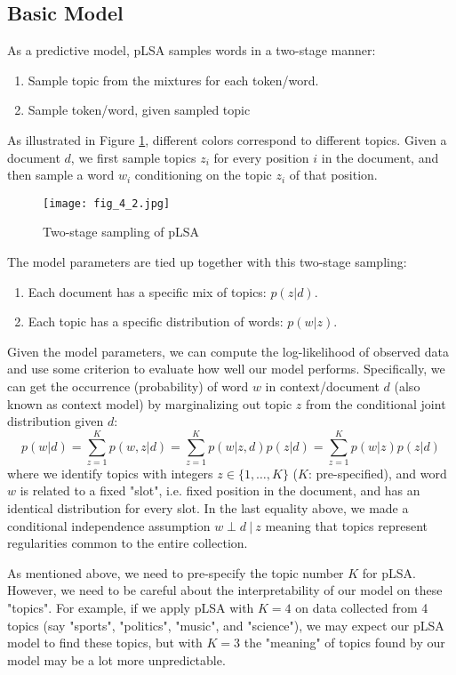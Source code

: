 \documentclass[../main.tex]{subfiles}
\begin{document}
\subsection{Basic Model}
As a predictive model, pLSA samples words in a two-stage manner:
\begin{enumerate}
	\item Sample topic from the mixtures for each token/word.
	\item Sample token/word, given sampled topic
\end{enumerate}
\par As illustrated in Figure \ref{fig_4_2}, different colors correspond to different topics. Given a document $d$, we first sample topics $z_i$ for every position $i$ in the document, and then sample a word $w_i$ conditioning on the topic $z_i$ of that position.
\begin{figure}[h] 
	\centering 
	\texttt{[image: fig\_4\_2.jpg]} 
	\caption{Two-stage sampling of pLSA}\label{fig_4_2}
\end{figure}
\par The model parameters are tied up together with this two-stage sampling:
\begin{enumerate}
	\item Each document has a specific mix of topics: $p(z|d)$.
	\item Each topic has a specific distribution of words: $p(w|z)$.
\end{enumerate}
\par Given the model parameters, we can compute the log-likelihood of observed data and use some criterion to evaluate how well our model performs. Specifically, we can get the occurrence (probability) of word $w$ in context/document $d$ (also known as context model) by marginalizing out topic $z$ from the conditional joint distribution given $d$:
\begin{equation}\label{eq_4_word_prob}
p(w|d)=\sum_{z=1}^{K}p(w,z|d)=\sum_{z=1}^{K}p(w|z,d)p(z|d) = \sum_{z=1}^{K}p(w|z)p(z|d)
\end{equation}
where we identify topics with integers $z\in \{1,\dots,K\}$ ($K$: pre-specified), and word $w$ is related to a fixed "slot", i.e. fixed position in the document, and has an identical distribution for every slot. In the last equality above, we made a conditional independence assumption $w\perp d\ |\ z$ meaning that topics represent regularities common to the entire collection.
\begin{remark}
	As mentioned above, we need to pre-specify the topic number $K$ for pLSA. However, we need to be careful about the interpretability of our model on these "topics". For example, if we apply pLSA with $K=4$ on data collected from 4 topics (say "sports", "politics", "music", and "science"), we may expect our pLSA model to find these topics, but with $K=3$ the "meaning" of topics found by our model may be a lot more unpredictable. 
\end{remark}
\end{document}
